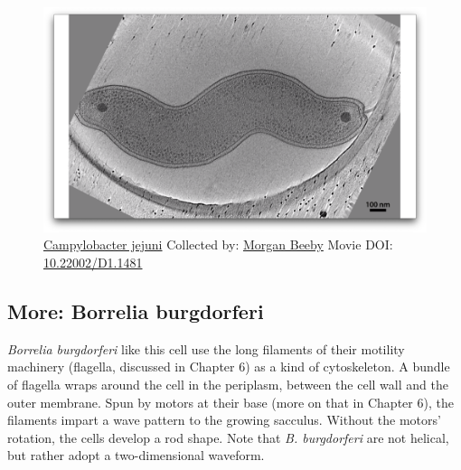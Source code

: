 \documentclass[]{tufte-book}
\begin{document}
\begin{figure}
\includegraphics{movie_stills/3_5} \caption[\protect\hyperlink{tree}{Campylobacter jejuni} Collected by:
\protect\hyperlink{morgan_beeby}{Morgan Beeby} Movie DOI:
\href{https://doi.org/10.22002/D1.1481}{10.22002/D1.1481}]{\protect\hyperlink{tree}{Campylobacter jejuni} Collected by:
\protect\hyperlink{morgan_beeby}{Morgan Beeby} Movie DOI:
\href{https://doi.org/10.22002/D1.1481}{10.22002/D1.1481}}\label{fig:3-5}
\end{figure}

\hypertarget{Borrelia_burgdorferi}{\subsection*{More: Borrelia
burgdorferi}\label{Borrelia_burgdorferi}}

\emph{Borrelia burgdorferi} like this cell use the long filaments of
their motility machinery (flagella, discussed in Chapter 6) as a kind of
cytoskeleton. A bundle of flagella wraps around the cell in the
periplasm, between the cell wall and the outer membrane. Spun by motors
at their base (more on that in Chapter 6), the filaments impart a wave
pattern to the growing sacculus. Without the motors' rotation, the cells
develop a rod shape. Note that \emph{B. burgdorferi} are not helical,
but rather adopt a two-dimensional waveform.
\end{document}
